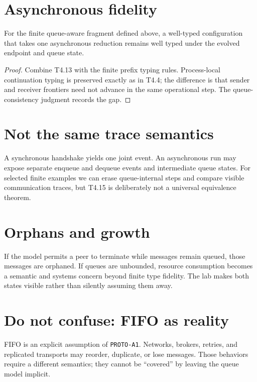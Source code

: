

\section{Asynchronous fidelity}
\begin{theorem}
For the finite queue-aware fragment defined above, a well-typed configuration that takes one asynchronous reduction remains well typed under the evolved endpoint and queue state.
\end{theorem}
\begin{proof}
Combine T4.13 with the finite prefix typing rules. Process-local continuation typing is preserved exactly as in T4.4; the difference is that sender and receiver frontiers need not advance in the same operational step. The queue-consistency judgment records the gap.
\end{proof}



\section{Not the same trace semantics}
A synchronous handshake yields one joint event. An asynchronous run may expose separate enqueue and dequeue events and intermediate queue states. For selected finite examples we can erase queue-internal steps and compare visible communication traces, but T4.15 is deliberately not a universal equivalence theorem.

\section{Orphans and growth}
If the model permits a peer to terminate while messages remain queued, those messages are orphaned. If queues are unbounded, resource consumption becomes a semantic and systems concern beyond finite type fidelity. The lab makes both states visible rather than silently assuming them away.



\section{Do not confuse: FIFO as reality}
\begin{warningbox}
FIFO is an explicit assumption of \texttt{PROTO-A1}. Networks, brokers, retries, and replicated transports may reorder, duplicate, or lose messages. Those behaviors require a different semantics; they cannot be ``covered'' by leaving the queue model implicit.
\end{warningbox}

